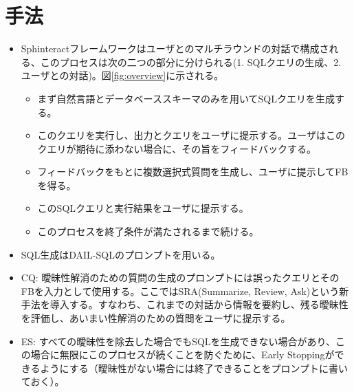 \documentclass[dvipdfmx,uplatex]{jsarticle}
\theoremstyle{remark}
\newenvironment{method}[1]{
    \begin{tcolorbox}[
        colframe=green!50!black,
        colback=green!50!black!10!white,
        colbacktitle=green!50!black!40!white,
        coltitle=black,
        fonttitle=\bfseries,
        title={#1}
    ]
}{
    \end{tcolorbox}
}
\begin{document}
\section{手法}
\begin{method}{Sphinteract}
\begin{itemize}
    \item Sphinteractフレームワークはユーザとのマルチラウンドの対話で構成される、このプロセスは次の二つの部分に分けられる(1. SQLクエリの生成、2. ユーザとの対話)。図\ref{fig:overview}に示される。
    \begin{itemize}
        \item まず自然言語とデータベーススキーマのみを用いてSQLクエリを生成する。
        \item このクエリを実行し、出力とクエリをユーザに提示する。ユーザはこのクエリが期待に添わない場合に、その旨をフィードバックする。
        \item フィードバックをもとに複数選択式質問を生成し、ユーザに提示してFBを得る。
        \item このSQLクエリと実行結果をユーザに提示する。
        \item このプロセスを終了条件が満たされるまで続ける。
    \end{itemize}
    \item SQL生成はDAIL-SQLのプロンプトを用いる。
    \item CQ: 曖昧性解消のための質問の生成のプロンプトには誤ったクエリとそのFBを入力として使用する。ここではSRA(Summarize, Review, Ask)という新手法を導入する。すなわち、これまでの対話から情報を要約し、残る曖昧性を評価し、あいまい性解消のための質問をユーザに提示する。
    \item ES: すべての曖昧性を除去した場合でもSQLを生成できない場合があり、この場合に無限にこのプロセスが続くことを防ぐために、Early Stoppingができるようにする（曖昧性がない場合には終了できることをプロンプトに書いておく）。
\end{itemize}
\end{method}
\end{document}
